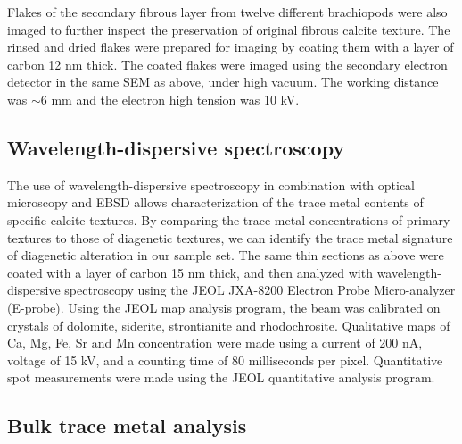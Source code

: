 \documentclass[5p, authoryear]{elsarticle}
\begin{document}
Flakes of the secondary fibrous layer from twelve different brachiopods were also imaged to further inspect the preservation of original fibrous calcite texture. The rinsed and dried flakes were prepared for imaging by coating them with a layer of carbon 12 nm thick. The coated flakes were imaged using the secondary electron detector in the same SEM as above, under high vacuum. The working distance was $\sim$6 mm and the electron high tension was 10 kV.

\subsection{Wavelength-dispersive spectroscopy}

The use of wavelength-dispersive spectroscopy in combination with optical microscopy and EBSD allows characterization of the trace metal contents of specific calcite textures. By comparing the trace metal concentrations of primary textures to those of diagenetic textures, we can identify the trace metal signature of diagenetic alteration in our sample set. The same thin sections as above were coated with a layer of carbon 15 nm thick, and then analyzed with wavelength-dispersive spectroscopy using the JEOL JXA-8200 Electron Probe Micro-analyzer (E-probe). Using the JEOL map analysis program, the beam was calibrated on crystals of dolomite, siderite, strontianite and rhodochrosite. Qualitative maps of Ca, Mg, Fe, Sr and Mn concentration were made using a current of 200 nA, voltage of 15 kV, and a counting time of 80 milliseconds per pixel. Quantitative spot measurements were made using the JEOL quantitative analysis program. 

\subsection{Bulk trace metal analysis}
\end{document}
